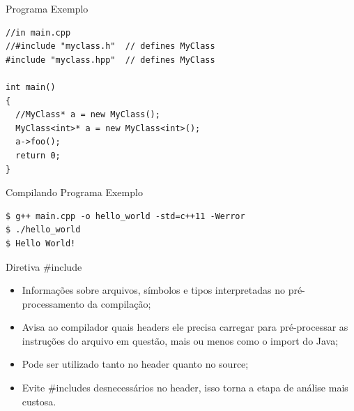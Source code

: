 \documentclass[12pt,table,xcolor={dvipsnames}]{beamer}
\begin{document}
\begin{frame}[fragile]{Programa Exemplo}
\begin{lstlisting}
//in main.cpp
//#include "myclass.h"  // defines MyClass
#include "myclass.hpp"  // defines MyClass

int main()
{
  //MyClass* a = new MyClass();
  MyClass<int>* a = new MyClass<int>();
  a->foo();
  return 0;
}
\end{lstlisting}
\end{frame}

\begin{frame}[fragile]{Compilando Programa Exemplo}
\begin{lstlisting}
$ g++ main.cpp -o hello_world -std=c++11 -Werror
$ ./hello_world
$ Hello World!
\end{lstlisting}
\end{frame}


\begin{frame}[fragile]{Diretiva \#include}
\begin{itemize}
\item Informações sobre arquivos, símbolos e tipos interpretadas no pré-processamento da compilação;
\item Avisa ao compilador quais headers ele precisa carregar para pré-processar as instruções do arquivo em questão, mais ou menos como o import do Java;
\item Pode ser utilizado tanto no header quanto no source;
\item Evite \#includes desnecessários no header, isso torna a etapa de análise mais custosa.
\end{itemize}
\end{frame}
\end{document}
